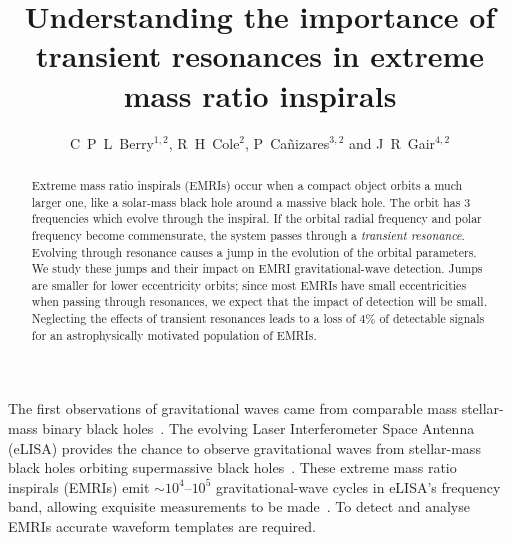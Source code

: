 \documentclass[a4paper]{jpconf}
\begin{document}
\title{Understanding the importance of transient resonances in extreme mass ratio inspirals}

\author{C~P~L~Berry$^{1,2}$, R~H~Cole$^{2}$, P~Ca\~{n}izares$^{3,2}$ and J~R~Gair$^{4,2}$}

\address{$^1$ School of Physics \& Astronomy, University of Birmingham, Birmingham, B15 2TT, UK}
\address{$^2$ Institute of Astronomy, Madingley Road, Cambridge, CB3 0HA, UK}
\address{$^3$ Institute of Mathematics, Astrophysics and Particle Physics, Radboud University, Heyendaalseweg 135, 6525 AJ Nijmegen, Netherlands}
\address{$^4$ School of Mathematics, University of Edinburgh, Peter Guthrie Tait Road, Edinburgh EH9 3FD, UK}


\begin{abstract}
Extreme mass ratio inspirals (EMRIs) occur when a compact object orbits a much larger one, like a solar-mass black hole around a massive black hole. The orbit has $3$ frequencies which evolve through the inspiral. If the orbital radial frequency and polar frequency become commensurate, the system passes through a \emph{transient resonance}. Evolving through resonance causes a jump in the evolution of the orbital parameters. We study these jumps and their impact on EMRI gravitational-wave detection. Jumps are smaller for lower eccentricity orbits; since most EMRIs have small eccentricities when passing through resonances, we expect that the impact of detection will be small. Neglecting the effects of transient resonances leads to a loss of $4\%$ of detectable signals for an astrophysically motivated population of EMRIs.
\end{abstract}



The first observations of gravitational waves came from comparable mass stellar-mass binary black holes~\cite{Abbott2016d}. The evolving Laser Interferometer Space Antenna (eLISA) provides the chance to observe gravitational waves from stellar-mass black holes orbiting supermassive black holes~\cite{Amaro-Seoane2007}. These extreme mass ratio inspirals (EMRIs) emit $\sim10^4$--$10^5$ gravitational-wave cycles in eLISA's frequency band, allowing exquisite measurements to be made~\cite{Barack2004}. To detect and analyse EMRIs accurate waveform templates are required.
\end{document}
